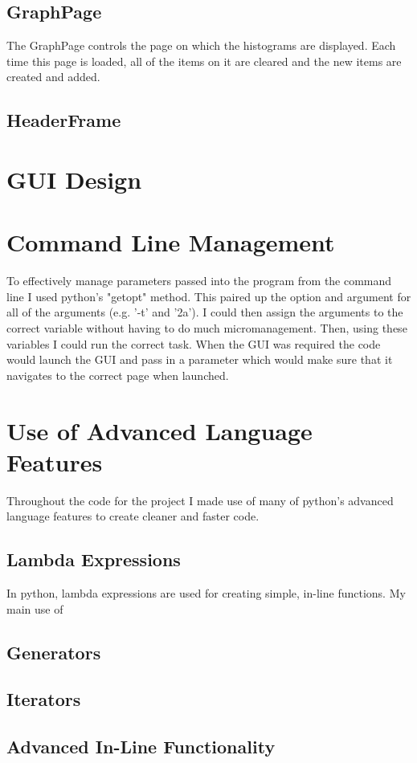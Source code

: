 \documentclass[11pt]{report}
\begin{document}
\subsection{GraphPage}
The GraphPage controls the page on which the histograms are displayed.  Each time this page is loaded, all of the items on it are cleared and the new items are created and added.

\subsection{HeaderFrame}


\section{GUI Design}

\section{Command Line Management}
To effectively manage parameters passed into the program from the command line I used python's "getopt" method.  This paired up the option and argument for all of the arguments (e.g. '-t' and '2a').  I could then assign the arguments to the correct variable without having to do much micromanagement.  Then, using these variables I could run the correct task.  When the GUI was required the code would launch the GUI and pass in a parameter which would make sure that it navigates to the correct page when launched.

\section{Use of Advanced Language Features}
Throughout the code for the project I made use of many of python's advanced language features to create cleaner and faster code.
\subsection{Lambda Expressions}
In python, lambda expressions are used for creating simple, in-line functions.  My main use of 
\subsection{Generators}
\subsection{Iterators}
\subsection{Advanced In-Line Functionality}
\end{document}
